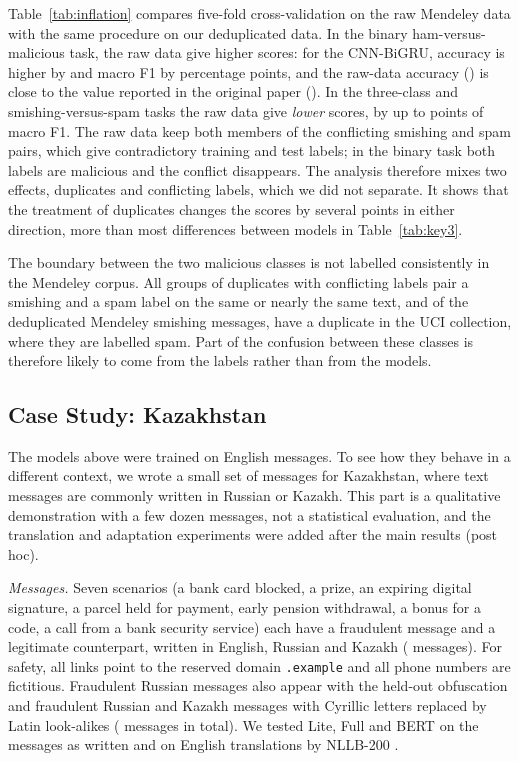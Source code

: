 Table~\ref{tab:inflation} compares five-fold cross-validation on the raw Mendeley data with the same procedure on our deduplicated data. In the binary ham-versus-malicious task, the raw data give higher scores: for the CNN-BiGRU, accuracy is higher by  and macro F1 by  percentage points, and the raw-data accuracy () is close to the value reported in the original paper (). In the three-class and smishing-versus-spam tasks the raw data give \emph{lower} scores, by up to  points of macro F1. The raw data keep both members of the conflicting smishing and spam pairs, which give contradictory training and test labels; in the binary task both labels are malicious and the conflict disappears. The analysis therefore mixes two effects, duplicates and conflicting labels, which we did not separate. It shows that the treatment of duplicates changes the scores by several points in either direction, more than most differences between models in Table~\ref{tab:key3}.

The boundary between the two malicious classes is not labelled consistently in the Mendeley corpus. All  groups of duplicates with conflicting labels pair a smishing and a spam label on the same or nearly the same text, and of the  deduplicated Mendeley smishing messages,  have a duplicate in the UCI collection, where they are labelled spam. Part of the confusion between these classes is therefore likely to come from the labels rather than from the models.



\subsection{Case Study: Kazakhstan}\label{sec:kz}

The models above were trained on English messages. To see how they behave in a different context, we wrote a small set of messages for Kazakhstan, where text messages are commonly written in Russian or Kazakh. This part is a qualitative demonstration with a few dozen messages, not a statistical evaluation, and the translation and adaptation experiments were added after the main results (post hoc).

\emph{Messages.} Seven scenarios (a bank card blocked, a prize, an expiring digital signature, a parcel held for payment, early pension withdrawal, a bonus for a code, a call from a bank security service) each have a fraudulent message and a legitimate counterpart, written in English, Russian and Kazakh ( messages). For safety, all links point to the reserved domain \texttt{.example} and all phone numbers are fictitious. Fraudulent Russian messages also appear with the held-out obfuscation and fraudulent Russian and Kazakh messages with Cyrillic letters replaced by Latin look-alikes ( messages in total). We tested Lite, Full and BERT on the messages as written and on English translations by NLLB-200 \cite{nllb2024}.


